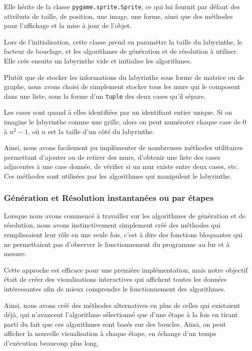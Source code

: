 \documentclass[12pt]{scrreprt} %
\begin{document}
Elle hérite de la classe \texttt{pygame.sprite.Sprite}, ce qui lui fournit par défaut des attributs de taille, de position, une image, une forme, ainsi que des méthodes pour l'affichage et la mise à jour de l'objet.

Lors de l'initialisation, cette classe prend en paramètre la taille du labyrinthe, le facteur de bouclage, et les algorithmes de génération et de résolution à utiliser. Elle crée ensuite un labyrinthe vide et initialise les algorithmes.

Plutôt que de stocker les informations du labyrinthe sous forme de matrice ou de graphe, nous avons choisi de simplement stocker tous les murs qui le composent dans une liste, sous la forme d'un \texttt{tuple} des deux cases qu'il sépare.

Les cases sont quand à elles identifiées par un identifiant entier unique. Si on imagine le labyrinthe comme une grille, alors on peut numéroter chaque case de $0$ à $n^2 - 1$, où $n$ est la taille d'un côté du labyrinthe.

Ainsi, nous avons facilement pu implémenter de nombreuses méthodes utilitaires permettant d'ajouter ou de retirer des murs, d'obtenir une liste des cases adjacentes à une case donnée, de vérifier si un mur existe entre deux cases, etc. Ces méthodes sont utilisées par les algorithmes qui manipulent le labyrinthe.

\subsubsection{Génération et Résolution instantanées ou par étapes}

Lorsque nous avons commencé à travailler sur les algorithmes de génération et de résolution, nous avons instinctivement simplement créé des méthodes qui remplissaient leur rôle en une seule fois, c'est à dire des fonctions bloquantes qui ne permettaient pas d'observer le fonctionnement du programme au fur et à mesure.

Cette approche est efficace pour une première implémentation, mais notre objectif était de créer des visualisations interactives qui affichent toutes les données intéressantes afin de mieux comprendre le fonctionnement des algorithmes.

Ainsi, nous avons créé des méthodes alternatives en plus de celles qui existaient déjà, qui n'avancent l'algorithme sélectionné que d'une étape à la fois en tirant parti du fait que ces algorithmes sont basés sur des boucles. Ainsi, on peut afficher la nouvelle visualisation à chaque étape, en échange d'un temps d'exécution beaucoup plus long.
\end{document}
